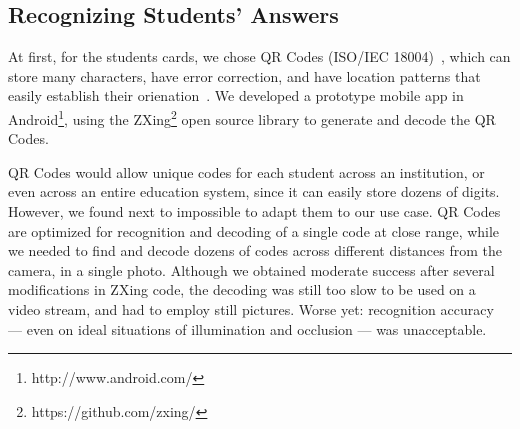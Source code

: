 




\subsection{Recognizing Students' Answers}

At first, for the students cards, we chose QR Codes (ISO/IEC 18004)~\cite{ISO18004}, which can store many characters, have error correction, and have location patterns that easily establish their orienation~\cite{belussi2013fast}. We developed a prototype mobile app in Android\footnote{http://www.android.com/}, using the ZXing\footnote{ https://github.com/zxing/} open source library to generate and decode the QR Codes.

QR Codes would allow unique codes for each student across an institution, or even across an entire education system, since it can easily store dozens of digits. However, we found next to impossible to adapt them to our use case. QR Codes are optimized for recognition and decoding of a single code at close range, while we needed to find and decode dozens of codes across different distances from the camera, in a single photo. Although we obtained moderate success after several modifications in ZXing code, the decoding was still too slow to be used on a video stream, and had to employ still pictures. Worse yet: recognition accuracy --- even on ideal situations of illumination and occlusion --- was unacceptable.

